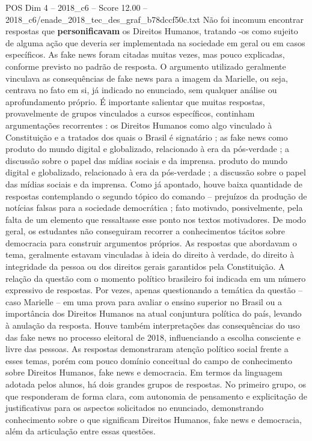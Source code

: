 \begin{textsample}{POS Dim 4 – 2018\_c6 – Score 12.00 – 2018\_c6/enade\_2018\_tec\_des\_graf\_b78dccf50c.txt}
Não foi incomum encontrar respostas que \textbf{personificavam} os Direitos Humanos, tratando -os como sujeito de alguma ação que deveria ser implementada na sociedade em geral ou em casos específicos.
As fake news foram citadas muitas vezes, mas pouco explicadas, conforme previsto no padrão de resposta.
O argumento utilizado geralmente vinculava as consequências de fake news para a imagem da Marielle, ou seja, centrava no fato em si, já indicado no enunciado, sem qualquer análise ou aprofundamento próprio.
É importante salientar que muitas respostas, provavelmente de grupos vinculados a cursos específicos, continham argumentações recorrentes : os Direitos Humanos como algo vinculado à Constituição e a tratados dos quais o Brasil é signatário ; as fake news como produto do mundo digital e globalizado, relacionado à era da pós-verdade ; a discussão sobre o papel das mídias sociais e da imprensa. produto do mundo digital e globalizado, relacionado à era da pós-verdade ; a discussão sobre o papel das mídias sociais e da imprensa.
Como já apontado, houve baixa quantidade de respostas contemplando o segundo tópico do comando – prejuízos da produção de notícias falsas para a sociedade democrática ; fato motivado, possivelmente, pela falta de um elemento que ressaltasse esse ponto nos textos motivadores.
De modo geral, os estudantes não conseguiram recorrer a conhecimentos tácitos sobre democracia para construir argumentos próprios.
As respostas que abordavam o tema, geralmente estavam vinculadas à ideia do direito à verdade, do direito à integridade da pessoa ou dos direitos gerais garantidos pela Constituição.
A relação da questão com o momento político brasileiro foi indicada em um número expressivo de respostas.
Por vezes, apenas questionando a temática da questão – caso Marielle – em uma prova para avaliar o ensino superior no Brasil ou a importância dos Direitos Humanos na atual conjuntura política do país, levando à anulação da resposta.
Houve também interpretações das consequências do uso das fake news no processo eleitoral de 2018, influenciando a escolha consciente e livre das pessoas.
As respostas demonstraram atenção político social frente a esses temas, porém com pouco domínio conceitual do campo de conhecimento sobre Direitos Humanos, fake news e democracia.
Em termos da linguagem adotada pelos alunos, há dois grandes grupos de respostas.
No primeiro grupo, os que responderam de forma clara, com autonomia de pensamento e explicitação de justificativas para os aspectos solicitados no enunciado, demonstrando conhecimento sobre o que significam Direitos Humanos, fake news e democracia, além da articulação entre essas questões.

\end{textsample}
